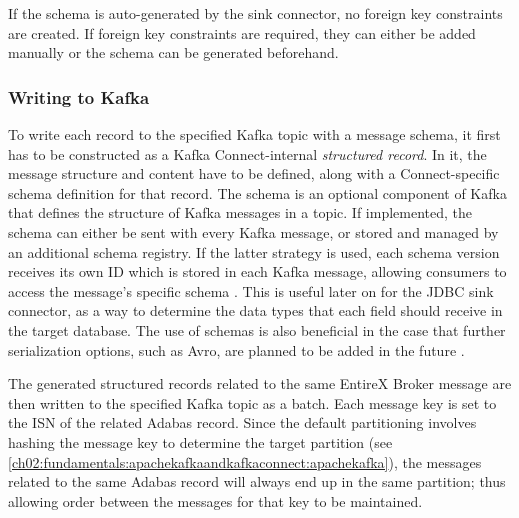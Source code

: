If the schema is auto-generated by the sink connector, no foreign key constraints are created. If foreign key constraints are required, they can either be added manually or the schema can be generated beforehand.




\subsubsection{Writing to Kafka} 
To write each record to the specified Kafka topic with a message schema, it first has to be constructed as a Kafka Connect-internal \textit{structured record}. In it, the message structure and content have to be defined, along with a Connect-specific schema definition for that record. The schema is an optional component of Kafka that defines the structure of Kafka messages in a topic. If implemented, the schema can either be sent with every Kafka message, or stored and managed by an additional schema registry. If the latter strategy is used, each schema version receives its own ID which is stored in each Kafka message, allowing consumers to access the message's specific schema \cite{kafkadatabaseinverted}. This is useful later on for the \ac{JDBC} sink connector, as a way to determine the data types that each field should receive in the target database. The use of schemas is also beneficial in the case that further serialization options, such as Avro, are planned to be added in the future \cite{kreps2011kafka}.

The generated structured records related to the same EntireX Broker message are then written to the specified Kafka topic as a batch. Each message key is set to the \ac{ISN} of the related Adabas record. Since the default partitioning involves hashing the message key to determine the target partition (see \ref{ch02:fundamentals:apachekafkaandkafkaconnect:apachekafka}), the messages related to the same Adabas record will always end up in the same partition; thus allowing order between the messages for that key to be maintained.

